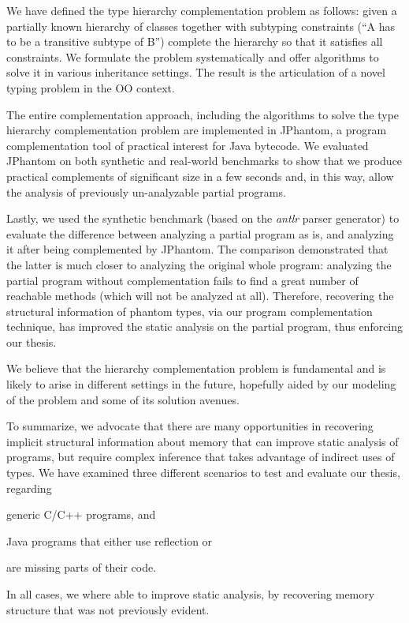 We have defined the type hierarchy complementation problem as follows:
given a partially known hierarchy of classes together with subtyping
constraints (``A has to be a transitive subtype of B'') complete the
hierarchy so that it satisfies all constraints. We formulate the
problem systematically and offer algorithms to solve it in various
inheritance settings. The result is the articulation of a novel typing
problem in the OO context.

The entire complementation approach, including the algorithms to solve
the type hierarchy complementation problem are implemented in
JPhantom, a program complementation tool of practical interest for
Java bytecode.
%
We evaluated JPhantom on both synthetic and real-world benchmarks to
show that we produce practical complements of significant size in a
few seconds and, in this way, allow the analysis of previously
un-analyzable partial programs.

Lastly, we used the synthetic benchmark (based on the \emph{antlr}
parser generator) to evaluate the difference between analyzing a
partial program as is, and analyzing it after being complemented by
JPhantom. The comparison demonstrated that the latter is much closer
to analyzing the original whole program: analyzing the partial program
without complementation fails to find a great number of reachable
methods (which will not be analyzed at all). Therefore, recovering the
structural information of phantom types, via our program
complementation technique, has improved the static analysis on the
partial program, thus enforcing our thesis.

We believe that the hierarchy complementation problem is fundamental
and is likely to arise in different settings in the future, hopefully
aided by our modeling of the problem and some of its solution avenues.

To summarize, we advocate that there are many opportunities in
recovering implicit structural information about memory that can
improve static analysis of programs, but require complex inference
that takes advantage of indirect uses of types. We have examined three
different scenarios to test and evaluate our thesis, regarding
\begin{inparablank}
\item generic C/C++ programs, and
\item Java programs that either use reflection or
\item are missing parts of their code.
\end{inparablank}
In all cases, we where able to improve static analysis, by recovering
memory structure that was not previously evident.

